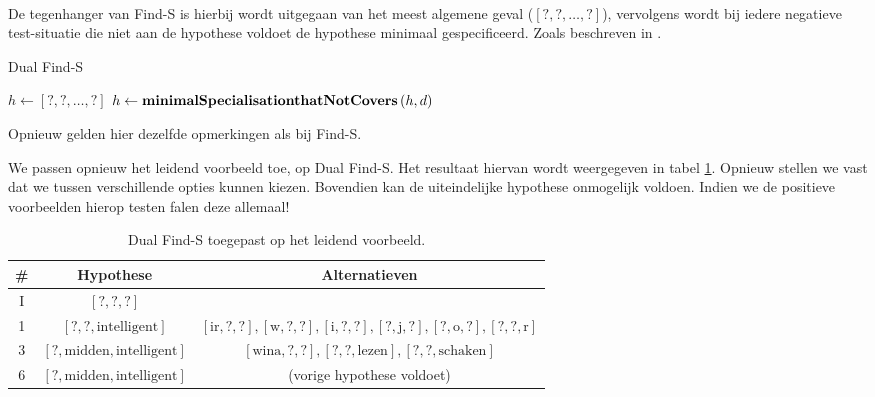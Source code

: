 \paragraph{}
De tegenhanger van Find-S is  hierbij wordt uitgegaan van het meest algemene geval ($\left[\mbox{?},\mbox{?},\ldots,\mbox{?}\right]$), vervolgens wordt bij iedere negatieve test-situatie die niet aan de hypothese voldoet de hypothese minimaal gespecificeerd. Zoals beschreven in .
\begin{algorithm}[htb]
\caption{Dual Find-S}
\label{alg:dualFindS}
\begin{algorithmic}[1]
\STATE $h\leftarrow\left[\mbox{?},\mbox{?},\ldots,\mbox{?}\right]$
\STATE $h\leftarrow\mbox{\bf minimalSpecialisationthatNotCovers}\left( h,d \right)$
\ENDIF
\ENDFOR
\end{algorithmic}
\end{algorithm}
Opnieuw gelden hier dezelfde opmerkingen als bij Find-S.
\begin{leftbar}
We passen opnieuw het leidend voorbeeld toe, op Dual Find-S. Het resultaat hiervan wordt weergegeven in tabel \ref{tbl:sollicitatieDualFindS}. Opnieuw stellen we vast dat we tussen verschillende opties kunnen kiezen. Bovendien kan de uiteindelijke hypothese onmogelijk voldoen. Indien we de positieve voorbeelden hierop testen falen deze allemaal!
\end{leftbar}
\begin{table}[htb]
\centering
\begin{tabular}{c|c|c}
\#&Hypothese&Alternatieven\\
\hline
I&$\left[?,?,?\right]$&\\
1&$\left[?,?,\mbox{intelligent}\right]$&$\left[\mbox{ir},?,?\right],\left[\mbox{w},?,?\right],\left[\mbox{i},?,?\right],\left[?,\mbox{j},?\right],\left[?,\mbox{o},?\right],\left[?,?,\mbox{r}\right]$\\
3&$\left[?,\mbox{midden},\mbox{intelligent}\right]$&$\left[\mbox{wina},?,?\right],\left[?,?,\mbox{lezen}\right],\left[?,?,\mbox{schaken}\right]$\\
6&$\left[?,\mbox{midden},\mbox{intelligent}\right]$&(vorige hypothese voldoet)
\end{tabular}
\caption{Dual Find-S toegepast op het leidend voorbeeld.}
\label{tbl:sollicitatieDualFindS}
\end{table}
